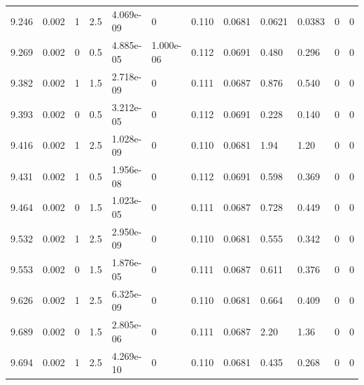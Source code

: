 \documentclass[preview]{standalone}
\begin{document}
{{{{{\begin{tabular}{L{1.2cm}C{1.2cm} C{0.3cm}C{0.5cm} C{1.4cm}C{1.4cm} C{1.4cm}C{1.4cm} C{1.6cm}C{1.6cm} C{1.6cm}C{1.6cm}}
  9.246  &  0.002  & 1     & 2.5 &  4.069e-09  & 0  &  0.110&   0.0681& 0.0621 & 0.0383   &  0 & 0  \\ 
  9.269  &  0.002  & 0     & 0.5 &  4.885e-05  & 1.000e-06  &  0.112&   0.0691& 0.480 & 0.296   &  0 & 0  \\ 
  9.382  &  0.002  & 1     & 1.5 &  2.718e-09  & 0  &  0.111&   0.0687& 0.876 & 0.540   &  0 & 0  \\ 
  9.393  &  0.002  & 0     & 0.5 &  3.212e-05  & 0  &  0.112&   0.0691& 0.228 & 0.140   &  0 & 0  \\ 
  9.416  &  0.002  & 1     & 2.5 &  1.028e-09  & 0  &  0.110&   0.0681& 1.94 & 1.20   &  0 & 0  \\ 
  9.431  &  0.002  & 1     & 0.5 &  1.956e-08  & 0  &  0.112&   0.0691& 0.598 & 0.369   &  0 & 0  \\ 
  9.464  &  0.002  & 0     & 1.5 &  1.023e-05  & 0  &  0.111&   0.0687& 0.728 & 0.449   &  0 & 0  \\ 
  9.532  &  0.002  & 1     & 2.5 &  2.950e-09  & 0  &  0.110&   0.0681& 0.555 & 0.342   &  0 & 0  \\ 
  9.553  &  0.002  & 0     & 1.5 &  1.876e-05  & 0  &  0.111&   0.0687& 0.611 & 0.376   &  0 & 0  \\ 
  9.626  &  0.002  & 1     & 2.5 &  6.325e-09  & 0  &  0.110&   0.0681& 0.664 & 0.409   &  0 & 0  \\ 
  9.689  &  0.002  & 0     & 1.5 &  2.805e-06  & 0  &  0.111&   0.0687& 2.20 & 1.36   &  0 & 0  \\ 
  9.694  &  0.002  & 1     & 2.5 &  4.269e-10  & 0  &  0.110&   0.0681& 0.435 & 0.268   &  0 & 0  \\ 
\hline 
\end{tabular} 

}}}}}
\end{document}
